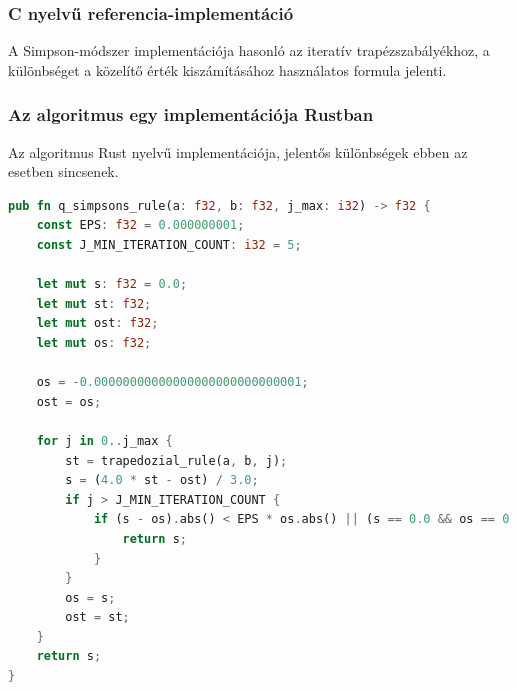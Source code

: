 \subsubsection{C nyelvű referencia-implementáció}
A Simpson-módszer implementációja hasonló az iteratív trapézszabályékhoz, a különbséget a közelítő érték kiszámításához használatos formula jelenti.
\subsubsection{Az algoritmus egy implementációja Rustban}
Az algoritmus Rust nyelvű implementációja, jelentős különbségek ebben az esetben sincsenek.
\begin{lstlisting}[language=Rust]
pub fn q_simpsons_rule(a: f32, b: f32, j_max: i32) -> f32 {
    const EPS: f32 = 0.000000001;
    const J_MIN_ITERATION_COUNT: i32 = 5;

    let mut s: f32 = 0.0;
    let mut st: f32;
    let mut ost: f32;
    let mut os: f32;

    os = -0.00000000000000000000000000001;
    ost = os;

    for j in 0..j_max {
        st = trapedozial_rule(a, b, j);
        s = (4.0 * st - ost) / 3.0;
        if j > J_MIN_ITERATION_COUNT {
            if (s - os).abs() < EPS * os.abs() || (s == 0.0 && os == 0.0) {
                return s;
            }
        }
        os = s;
        ost = st;
    }
    return s;
}
\end{lstlisting}
